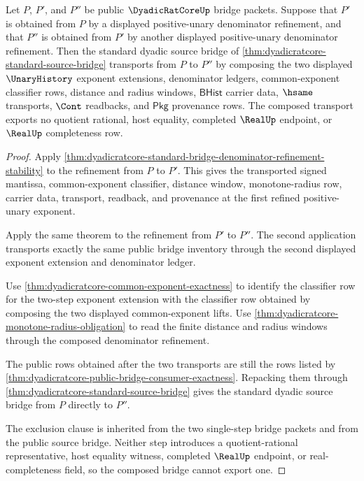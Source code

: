 \begin{theorem}
\label{thm:dyadicratcore-standard-bridge-denominator-refinement-composition}
Let $P$, $P'$, and $P''$ be public $\DyadicRatCoreUp$ bridge packets. Suppose
that $P'$ is obtained from $P$ by a displayed positive-unary denominator
refinement, and that $P''$ is obtained from $P'$ by another displayed
positive-unary denominator refinement. Then the standard dyadic source bridge
of \autoref{thm:dyadicratcore-standard-source-bridge} transports from $P$ to
$P''$ by composing the two displayed $\UnaryHistory$ exponent extensions,
denominator ledgers, common-exponent classifier rows, distance and radius
windows, $\mathsf{BHist}$ carrier data, $\hsame$ transports, $\Cont$
readbacks, and $\mathsf{Pkg}$ provenance rows. The composed transport exports
no quotient rational, host equality, completed $\RealUp$ endpoint, or
$\RealUp$ completeness row.
\end{theorem}
\begin{proof}
Apply
\autoref{thm:dyadicratcore-standard-bridge-denominator-refinement-stability}
to the refinement from $P$ to $P'$. This gives the transported signed
mantissa, common-exponent classifier, distance window, monotone-radius row,
carrier data, transport, readback, and provenance at the first refined
positive-unary exponent.

Apply the same theorem to the refinement from $P'$ to $P''$. The second
application transports exactly the same public bridge inventory through the
second displayed exponent extension and denominator ledger.

Use \autoref{thm:dyadicratcore-common-exponent-exactness} to identify the
classifier row for the two-step exponent extension with the classifier row
obtained by composing the two displayed common-exponent lifts. Use
\autoref{thm:dyadicratcore-monotone-radius-obligation} to read the finite
distance and radius windows through the composed denominator refinement.

The public rows obtained after the two transports are still the rows listed by
\autoref{thm:dyadicratcore-public-bridge-consumer-exactness}. Repacking them
through \autoref{thm:dyadicratcore-standard-source-bridge} gives the standard
dyadic source bridge from $P$ directly to $P''$.

The exclusion clause is inherited from the two single-step bridge packets and
from the public source bridge. Neither step introduces a quotient-rational
representative, host equality witness, completed $\RealUp$ endpoint, or
real-completeness field, so the composed bridge cannot export one.
\end{proof}

